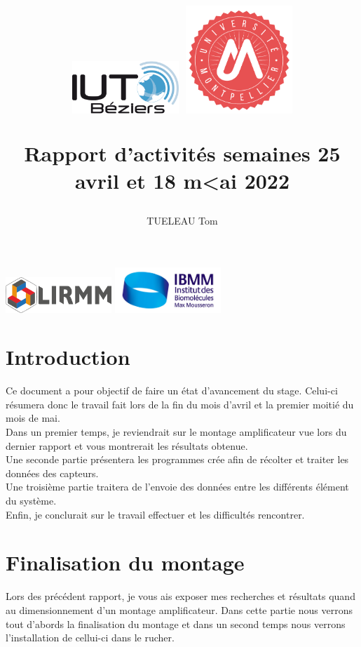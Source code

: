 \documentclass[11pt,french,a4paper]{article}
\title{
 \centering
         \includegraphics[width=4cm]{../../../logo/IUTlogo.png}  \hspace{7cm}
         \includegraphics[width=4cm]{../../../logo/UMlogo.png}  \hspace{7cm}
    
	\LARGE{Rapport d'activités semaines 25 avril et 18 m<ai 2022 }
	\author{TUELEAU Tom}
}
\author{
	\date{}
}
\begin{document}
\maketitle
	 \includegraphics[width=4cm]{../../../logo/LIRMMlogo.png}  \hspace{7cm}
         \includegraphics[width=4cm]{../../../logo/IBMMlogo.jpg}  \hspace{7cm}
\newpage
\tableofcontents
\newpage
\section{Introduction}
Ce document a pour objectif de faire un état d'avancement du stage. Celui-ci résumera donc le travail fait lors de la fin du mois d'avril et la premier moitié du mois de mai.
\\Dans un premier temps, je reviendrait sur le montage amplificateur vue lors du dernier rapport et vous montrerait les résultats obtenue.
\\Une seconde partie présentera les programmes crée afin de récolter et traiter les données des capteurs. 
\\Une troisième partie traitera de l'envoie des données entre les différents élément du système.
\\Enfin, je conclurait sur le travail effectuer et les difficultés rencontrer. 

\section{Finalisation du montage}
Lors des précédent rapport, je vous ais exposer mes recherches et résultats quand au dimensionnement d'un montage amplificateur. Dans cette partie nous verrons tout d'abords la finalisation du montage et dans un second temps nous verrons l'installation de cellui-ci dans le rucher.\\
\end{document}
